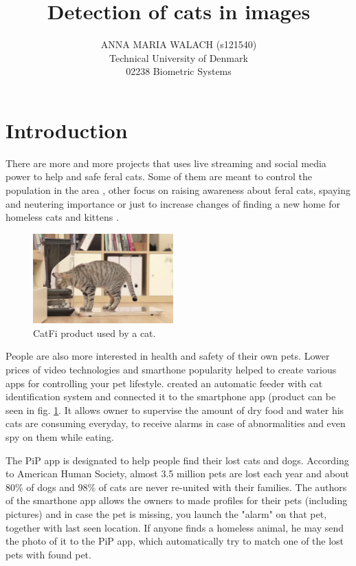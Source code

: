 \documentclass[hyperref]{acmtrans2e}
\title{Detection of cats in images}
\author{ANNA MARIA WALACH (s121540) \\Technical University of Denmark\\02238 Biometric Systems}
\begin{document}
\setcounter{page}{111}

\maketitle

\section{Introduction}
There are more and more projects that uses live streaming and social media power to help and safe feral cats. Some of them are meant to control the population in the area \cite{LAPS:2015}, other focus on raising awareness about feral cats, spaying and neutering importance \cite{TinyKittens:2015} or just to increase changes of finding a new home for homeless cats and kittens \cite{CritterRoom:2015}.

\begin{figure}
\centering
    \includegraphics[width=0.48\textwidth]{bistro}
  \caption{CatFi product used by a cat.}
  \label{fig:bistro}
\end{figure}
People are also more interested in health and safety of their own pets. Lower prices of video technologies and smarthone popularity helped to create various apps for controlling your pet lifestyle. \cite{CatFi:2015} created an automatic feeder with cat identification system and connected it to the smartphone app (product can be seen in fig. \ref{fig:bistro}. It allows owner to supervise the amount of dry food and water his cats are consuming everyday, to receive alarms in case of abnormalities and even spy on them while eating. 

The PiP \cite{PiP:2013} app is designated to help people find their lost cats and dogs. According to American Human Society, almost 3.5 million pets are lost each year and about 80\% of dogs and 98\% of cats are never re-united with their families. The authors of the smarthone app allows the owners to made profiles for their pets (including pictures) and in case the pet is missing, you launch the "alarm" on that pet, together with last seen location. If anyone finds a homeless animal, he may send the photo of it to the PiP app, which automatically try to match one of the lost pets with found pet. 
\end{document}
